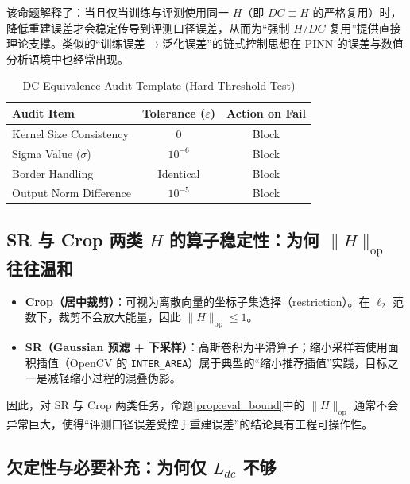 该命题解释了：当且仅当训练与评测使用同一 $H$（即 $DC\equiv H$ 的严格复用）时，降低重建误差才会稳定传导到评测口径误差，从而为“强制 $H/DC$ 复用”提供直接理论支撑。类似的“训练误差$\to$泛化误差”的链式控制思想在 PINN 的误差与数值分析语境中也经常出现\cite{deryck2022kolmogorov,deryck2024acta_numerica}。

\begin{table}[htbp]
  \centering
  \caption{DC Equivalence Audit Template (Hard Threshold Test)}
  \label{tab:dc_equivalence_template}
  \begin{tabular}{lcc}
    \toprule
    Audit Item & Tolerance ($\varepsilon$) & Action on Fail \\
    \midrule
    Kernel Size Consistency & 0 & Block \\
    Sigma Value ($\sigma$) & $10^{-6}$ & Block \\
    Border Handling & Identical & Block \\
    Output Norm Difference & $10^{-5}$ & Block \\
    \bottomrule
  \end{tabular}
\end{table}

\subsection{SR 与 Crop 两类 \texorpdfstring{$H$}{H} 的算子稳定性：为何 \texorpdfstring{$\|H\|_{\mathrm{op}}$}{||H||op} 往往温和}\label{sec:H_stability}

\begin{itemize}
\item \textbf{Crop（居中裁剪）}：可视为离散向量的坐标子集选择（restriction）。在 $\ell_2$ 范数下，裁剪不会放大能量，因此 $\|H\|_{\mathrm{op}}\le 1$。
\item \textbf{SR（Gaussian 预滤 + 下采样）}：高斯卷积为平滑算子；缩小采样若使用面积插值（OpenCV 的 \texttt{INTER\_AREA}）属于典型的“缩小推荐插值”实践，目标之一是减轻缩小过程的混叠伪影\cite{opencv_resize,opencv_gaussianblur}。
\end{itemize}

因此，对 SR 与 Crop 两类任务，命题\ref{prop:eval_bound}中的 $\|H\|_{\mathrm{op}}$ 通常不会异常巨大，使得“评测口径误差受控于重建误差”的结论具有工程可操作性。

\subsection{欠定性与必要补充：为何仅 \texorpdfstring{$L_{dc}$}{Ldc} 不够}\label{sec:underdetermined}

